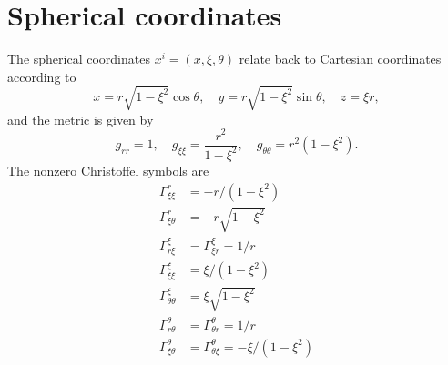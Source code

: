 \documentclass[preprint]{revtex4}
\begin{document}
\section{Spherical coordinates}
 The spherical coordinates $x^i=(x,\xi,\theta)$ relate back to Cartesian coordinates according to 
\begin{equation}
 x=r\sqrt{1-\xi^2}\cos\theta,\quad y=r\sqrt{1-\xi^2}\sin\theta,\quad z=\xi r,
\end{equation}
and the metric is given by
\begin{equation}
g_{rr}=1,\quad g_{\xi\xi}=\frac{r^2}{1-\xi^2},\quad g_{\theta\theta}=r^2\left(1-\xi^2\right).
\end{equation}
The nonzero Christoffel symbols are
\begin{align}
\Gamma^r_{\xi\xi}&=-r/(1-\xi^2)\\
\Gamma^r_{\xi\theta}&=-r\sqrt{1-\xi^2}\\
\Gamma^{\xi}_{r\xi}&=\Gamma^{\xi}_{\xi r}=1/r\\
\Gamma^{\xi}_{\xi\xi}&=\xi/(1-\xi^2)\\
\Gamma^{\xi}_{\theta\theta}&=\xi\sqrt{1-\xi^2}\\
\Gamma^{\theta}_{r\theta}&=\Gamma^{\theta}_{\theta r}=1/r\\
\Gamma^{\theta}_{\xi\theta}&=\Gamma^{\theta}_{\theta \xi}=-\xi/(1-\xi^2)
\end{align}



\end{document}
